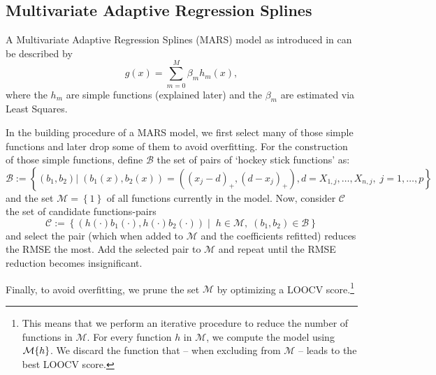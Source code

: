 \subsection{Multivariate Adaptive Regression Splines}{\label{sec:corr_model_MARS}
    A Multivariate Adaptive Regression Splines (MARS) model as introduced in \cite{friedmanMultivariateAdaptiveRegression1991} can be described by 
    \begin{equation}
        \label{eq:mars}
        g(x) = \sum_{m=0}^M \beta_m h_m(x),
    \end{equation}
    where the $h_m$ are simple functions (explained later) and the $\beta_m$ are estimated via Least Squares. 
    
    In the building procedure of a MARS model, we first select many of those simple functions and later drop some of them to avoid overfitting. For the construction of those simple functions, define $\mathcal{B}$ the set of pairs of `hockey stick functions' as:
    \begin{equation}
        \label{eq:mars_basis_fun}
        \mathcal{B}:=\left\{
            \left(b_1,b_2\right) 
            | \;
            \left(b_1(x),b_2(x)\right) = \left(\left(x_{j}-d\right)_+,\left(d-x_{j}\right)_+\right),
            d =X_{1, j},  \ldots, X_{n, j},\;
            j=1, \ldots, p
        \right\}
    \end{equation}
    and the set $\mathcal{M}=\left\{1\right\}$ of all functions currently in the model. Now, consider $\mathcal{C}$ the set of candidate functions-pairs 
    \begin{equation}
        \label{eq:mars_candidate}
        \mathcal{C}:=\left\{
            \left(h(\cdot)b_1(\cdot),  h(\cdot)b_2(\cdot) \right)
            \;| \;\; h\in\mathcal{M}, \; 
            (b_1,b_2) \in \mathcal{B}
        \right\}
    \end{equation}
    and select the pair (which when added to $\mathcal{M}$ and the coefficients refitted) reduces the RMSE the most. Add the selected pair to $\mathcal{M}$ and repeat until the RMSE reduction becomes insignificant.

    Finally, to avoid overfitting, we prune the set $\mathcal{M}$ by optimizing a LOOCV score.\footnote{This means that we perform an iterative procedure to reduce the number of functions in $\mathcal{M}$. For every function $h$ in $\mathcal{M}$, we compute the model using $\mathcal{M}\\\{h\}$. We discard the function that -- when excluding from $\mathcal{M}$ -- leads to the best LOOCV score.}  

}
